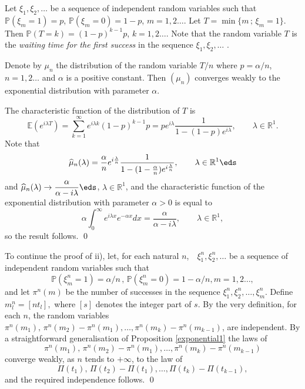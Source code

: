 \documentclass[preprint]{imsart}
\def\P{\mathbb P}
\def\E{\mathbb E}
\def\R{\mathbb R}
\def\ds{\displaystyle}
\begin{document}
{\noindent Let $\xi_1,\xi_2,\ldots$ be a sequence of independent random
variables such that $\P (\xi_m=1)=p$,  $\P (\xi_m=0)=1-p$,
$m=1,2\ldots$. Let $T=\min \{m\,  ;\,  \xi_m=1\}$. Then
$\P (T=k)=(1-p)^{k-1}p$, $k=1,2\ldots$.
Note that the random variable $T$ is the {\it waiting time for the first  success}  in the sequence $\xi_1,\xi_2,\ldots$ .
\begin{Proposition}\label{exponential1}
Denote by $\mu_n$ the distribution  of the random variable $T/n$ where
$p=\alpha /n$,  $n=1,2\ldots$ and $\alpha$ is a positive
constant. Then $(\mu_n)$ converges weakly to the exponential
distribution with parameter $\alpha$.
\end{Proposition}

 The characteristic
function of the distribution of $T$ is
$$
\E\left( e^{i\lambda T}\right) =
\sum_{k=1}^\infty  e^{i\lambda k} (1-p)^{k-1}p
=
pe^{i\lambda }\frac{1}{1-(1-p)e^{i\lambda }},
\qquad \lambda\in\R^1.
$$
Note that
$$\ds
\widehat{\mu}_n (\lambda) =\frac{\alpha}{n}
e^{i\frac{\lambda}{n}}
\frac{1}{1-(1-\frac{\alpha}{n})e^{i\frac{\lambda}{n} }},
\qquad \lambda\in\R^1
\eds
$$
and $\widehat{\mu}_n (\lambda) \to \ds\frac{\alpha}{
\alpha -i\lambda}\eds$,  $\lambda\in\R^1$, and the
characteristic function of the exponential distribution with
parameter $\alpha >0$ is equal to
$$
\alpha\int_0^\infty
e^{i\lambda x } e^{-\alpha  x}dx =
\frac{\alpha}{\alpha -i\lambda},
\qquad  \lambda\in\R^1,
$$
so the result follows. \qed
\vspace{2mm}

\noindent To continue the proof of ii), let, for each natural $n$,\,\,\,\,  $\xi_1^n,\xi_2^n ,\ldots$
be a sequence  of independent random
variables such that
$$
\P (\xi_m^n=1)= \alpha/n\,,  \,\P (\xi_m^n=0)=1-\alpha/n, m=1,2\ldots,
$$
and let
$\pi^n(m)$ be the number of successes in the sequence $\xi_1^n,\xi_2^n,\ldots, \xi_m^n$.
 Define $m_l^n = [nt_l],$ where $[s]$ denotes the integer part of $s$.
By the very definition, for each $n$, the random
variables $\pi^{n}(m_1),\,\pi^{n}(m_2) -\pi^{n}(m_1),\ldots, \pi^{n}(m_{k}) -\pi^{n}(m_{k-1})$, are independent. By a
straightforward generalisation of Proposition \ref{exponential1} the laws of
$$
\pi^{n}(m_1),\,\pi^{n}(m_2) -\pi^{n}(m_1), \ldots, \pi^{n}(m_{k}) -\pi^{n}(m_{k-1})
$$
converge weakly, as $n$ tends to $+\infty$, to the law of
$$
\Pi(t_1),\,\Pi(t_2) -\Pi(t_1),\ldots, \Pi(t_{k}) -\Pi(t_{k-1}),
$$
and the required independence follows. \qed
\vspace{2mm}

}
\end{document}

